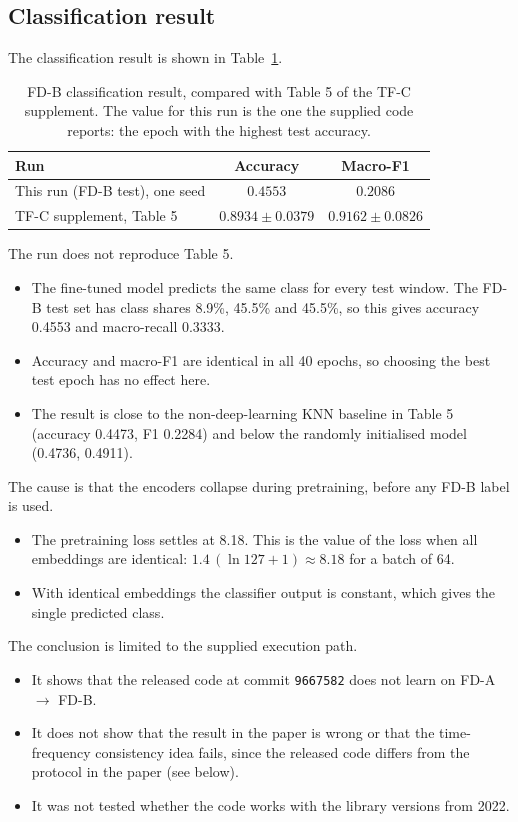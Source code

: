 \documentclass[a4paper,11pt]{article}
\newcommand{\code}[1]{\texttt{#1}}
\begin{document}
\subsection{Classification result}
The classification result is shown in Table~\ref{tab:tfc-result}.

\begin{table}[htbp]
    \centering
    \small
    \begin{tabular}{l c c}
        \toprule
        Run & Accuracy & Macro-F1 \\
        \midrule
        This run (FD-B test), one seed & $0.4553$ & $0.2086$ \\
        TF-C supplement, Table 5 & $0.8934 \pm 0.0379$ & $0.9162 \pm 0.0826$ \\
        \bottomrule
    \end{tabular}
    \caption{FD-B classification result, compared with Table 5 of the TF-C supplement. The value for this run is the one the supplied code reports: the epoch with the highest test accuracy.}
    \label{tab:tfc-result}
\end{table}

The run does not reproduce Table 5.
\begin{itemize}
    \item The fine-tuned model predicts the same class for every test window. The FD-B test set has class shares 8.9\%, 45.5\% and 45.5\%, so this gives accuracy 0.4553 and macro-recall 0.3333.
    \item Accuracy and macro-F1 are identical in all 40 epochs, so choosing the best test epoch has no effect here.
    \item The result is close to the non-deep-learning KNN baseline in Table 5 (accuracy 0.4473, F1 0.2284) and below the randomly initialised model (0.4736, 0.4911).
\end{itemize}

The cause is that the encoders collapse during pretraining, before any FD-B label is used.
\begin{itemize}
    \item The pretraining loss settles at 8.18. This is the value of the loss when all embeddings are identical: $1.4\,(\ln 127 + 1) \approx 8.18$ for a batch of 64.
    \item With identical embeddings the classifier output is constant, which gives the single predicted class.
\end{itemize}

The conclusion is limited to the supplied execution path.
\begin{itemize}
    \item It shows that the released code at commit \code{9667582} does not learn on FD-A $\rightarrow$ FD-B.
    \item It does not show that the result in the paper is wrong or that the time-frequency consistency idea fails, since the released code differs from the protocol in the paper (see below).
    \item It was not tested whether the code works with the library versions from 2022.
\end{itemize}
\end{document}
